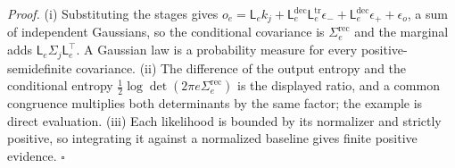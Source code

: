 \noindent\emph{Proof.}
(i) Substituting the stages gives
\(o_e=\mathsf L_ek_j+\mathsf L^{\mathrm{dec}}_e\mathsf L^{\mathrm{tr}}_e\epsilon_-+\mathsf L^{\mathrm{dec}}_e\epsilon_++\epsilon_o\),
a sum of independent Gaussians, so the conditional covariance is
\(\Sigma^{\mathrm{rec}}_e\) and the marginal adds \(\mathsf L_e\Sigma_j\mathsf L_e^\top\).
A Gaussian law is a probability measure for every positive-semidefinite
covariance. (ii) The difference of the output entropy and the conditional
entropy \(\tfrac12\log\det(2\pi e\Sigma^{\mathrm{rec}}_e)\) is the displayed
ratio, and a common congruence multiplies both determinants by the same
factor; the example is direct evaluation. (iii) Each likelihood is bounded by
its normalizer and strictly positive, so integrating it against a normalized
baseline gives finite positive evidence. \(\square\)
